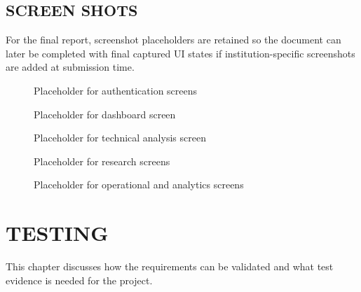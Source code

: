 \documentclass[12pt,a4paper]{report}
\begin{document}
\section{SCREEN SHOTS}
For the final report, screenshot placeholders are retained so the document can later be completed with final captured UI states if institution-specific screenshots are added at submission time.

\begin{figure}[H]
\centering
{}
\caption{Placeholder for authentication screens}
\end{figure}

\begin{figure}[H]
\centering
{}
\caption{Placeholder for dashboard screen}
\end{figure}

\begin{figure}[H]
\centering
{}
\caption{Placeholder for technical analysis screen}
\end{figure}

\begin{figure}[H]
\centering
{}
\caption{Placeholder for research screens}
\end{figure}

\begin{figure}[H]
\centering
{}
\caption{Placeholder for operational and analytics screens}
\end{figure}

\chapter{TESTING}
This chapter discusses how the requirements can be validated and what test evidence is needed for the project.
\end{document}
